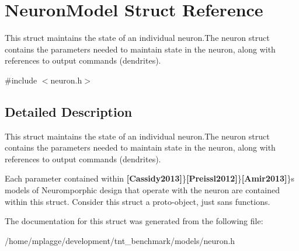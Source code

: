 \hypertarget{struct_neuron_model}{}\section{Neuron\+Model Struct Reference}
\label{struct_neuron_model}


This struct maintains the state of an individual neuron.\+The neuron struct contains the parameters needed to maintain state in the neuron, along with references to output commands (dendrites).  




{\ttfamily \#include $<$neuron.\+h$>$}



\subsection{Detailed Description}
This struct maintains the state of an individual neuron.\+The neuron struct contains the parameters needed to maintain state in the neuron, along with references to output commands (dendrites). 

Each parameter contained within {\bfseries [Cassidy2013]}\}{\bfseries [Preissl2012]}\}{\bfseries [Amir2013]}\}\textquotesingle{}s models of Neuromporphic design that operate with the neuron are contained within this struct. Consider this struct a proto-\/object, just sans functions. 

The documentation for this struct was generated from the following file\+:\begin{DoxyCompactItemize}
\item 
/home/mplagge/development/tnt\+\_\+benchmark/models/neuron.\+h\end{DoxyCompactItemize}
